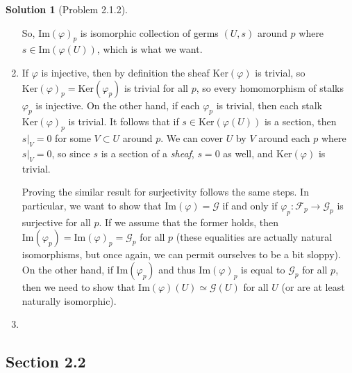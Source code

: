 \documentclass[aps,pra,showpacs,notitlepage,onecolumn,superscriptaddress,nofootinbib]{revtex4-1}
\theoremstyle{definition}
\newtheorem{solution}{Solution}[section]
\begin{document}
\begin{solution}[Problem 2.1.2]
\begin{enumerate}
      So, $\text{Im}(\varphi)_p$ is isomorphic collection of germs $(U, s)$ around $p$ where $s \in \text{Im}(\varphi(U))$, which is what we want.
      \item If $\varphi$ is injective, then by definition the sheaf $\text{Ker}(\varphi)$ is trivial, so $\text{Ker}(\varphi)_p = \text{Ker}(\varphi_p)$ is trivial for all $p$, so every homomorphism of
        stalks $\varphi_p$ is injective. On the other hand, if each $\varphi_p$ is trivial, then each stalk $\text{Ker}(\varphi)_p$ is trivial. It follows that if $s \in \text{Ker}(\varphi(U))$ is a section,
        then $s|_V = 0$ for some $V \subset U$ around $p$. We can cover $U$ by $V$ around each $p$ where $s|_V = 0$, so since $s$ is a section of a \emph{sheaf}, $s = 0$
        as well, and $\text{Ker}(\varphi)$ is trivial.

        Proving the similar result for surjectivity follows the same steps. In particular, we want to show that $\text{Im}(\varphi) = \mathcal{G}$ if and only if $\varphi_p : \mathcal{F}_p \rightarrow \mathcal{G}_p$ is surjective
        for all $p$. If we assume that the former holds, then $\text{Im}(\varphi_p) = \text{Im}(\varphi)_p = \mathcal{G}_p$ for all $p$ (these equalities are actually natural isomorphisms, but once again, we can
        permit ourselves to be a bit sloppy). On the other hand, if $\text{Im}(\varphi_p)$ and thus $\text{Im}(\varphi)_p$ is equal to $\mathcal{G}_p$ for all $p$, then we need to show that $\text{Im}(\varphi)(U) \simeq \mathcal{G}(U)$
        for all $U$ (or are at least naturally isomorphic). 
      \item 
    \end{enumerate}
  \end{solution}

\subsection{Section 2.2}
\end{document}
